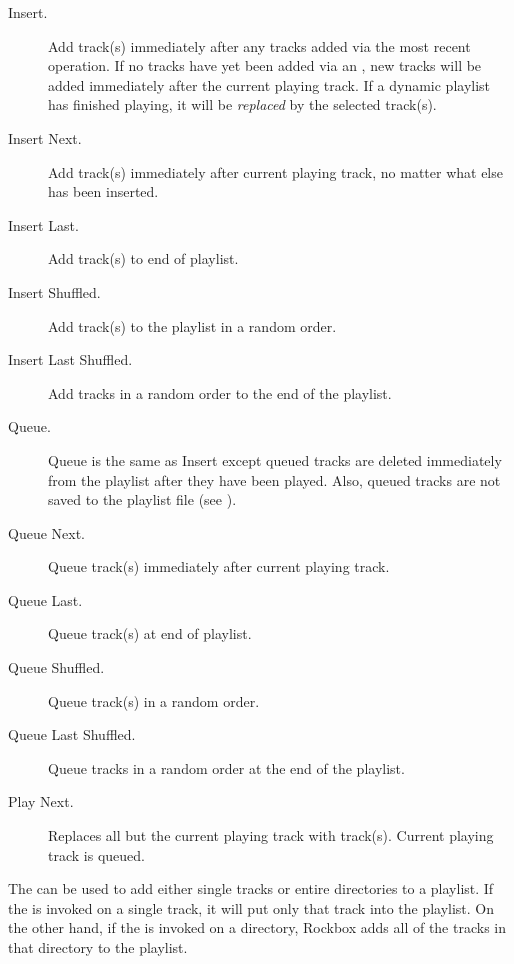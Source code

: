 \begin{description}
\item [Insert.] Add track(s) immediately after any tracks added via the most
  recent  operation. If no tracks have yet been added via an
  , new tracks will be added immediately after the current
  playing track. If a dynamic playlist has finished playing,
  it will be \emph{replaced} by the selected track(s).

\item [Insert Next.] Add track(s) immediately after current playing
  track, no matter what else has been inserted.

\item [Insert Last.] Add track(s) to end of playlist.

\item [Insert Shuffled.] Add track(s) to the playlist in a random order.

\item [Insert Last Shuffled.] Add tracks in a random order to the end of the playlist.

\item [Queue.] Queue is the same as Insert except queued tracks are
  deleted immediately from the playlist after they have been played. Also,
  queued tracks are not saved to the playlist file (see
  ).
  
\item [Queue Next.] Queue track(s) immediately after current playing track.
  
\item [Queue Last.] Queue track(s) at end of playlist.

\item [Queue Shuffled.] Queue track(s) in a random order.

\item [Queue Last Shuffled.] Queue tracks in a random order at the end of the playlist.

\item [Play Next.] Replaces all but the current playing track with track(s).
    Current playing track is queued.
\end{description}

The   can be used to add either single tracks or
entire directories to a playlist. If the  is
invoked on a single track, it will put only that track into the playlist.
On the other hand, if the  is invoked on a
directory, Rockbox adds all of the tracks in that directory to the
playlist.

